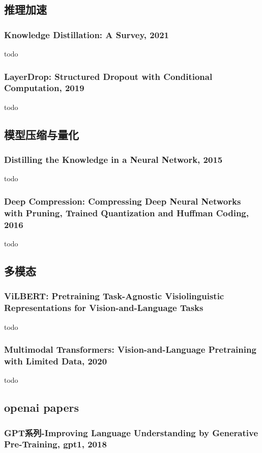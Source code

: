 \documentclass[twocolumn, 10pt]{article} %
\begin{document}
\subsection{推理加速}
\subsubsection{Knowledge Distillation: A Survey, 2021}
todo 

\subsubsection{LayerDrop: Structured Dropout with Conditional Computation, 2019}
todo 

\subsection{模型压缩与量化}

\subsubsection{Distilling the Knowledge in a Neural Network, 2015}
todo 


\subsubsection{Deep Compression: Compressing Deep Neural Networks with Pruning, Trained Quantization and Huffman Coding, 2016}
todo 


\subsection{多模态}
\subsubsection{ViLBERT: Pretraining Task-Agnostic Visiolinguistic Representations for Vision-and-Language Tasks}
todo
\subsubsection{Multimodal Transformers: Vision-and-Language Pretraining with Limited Data, 2020}
todo

\subsection{openai papers}
\subsubsection{ GPT系列-Improving Language Understanding by Generative Pre-Training, gpt1, 2018}
\end{document}
